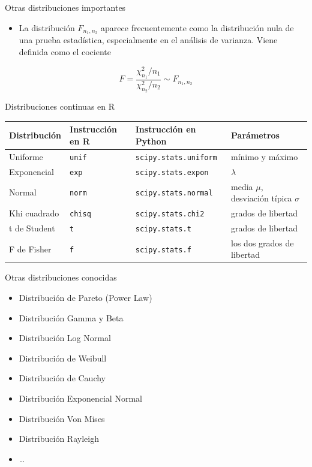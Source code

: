 \documentclass[
  ignorenonframetext,
]{beamer}
\providecommand{\tightlist}{%
  \setlength{\itemsep}{0pt}\setlength{\parskip}{0pt}}
\begin{document}
\begin{frame}{Otras distribuciones importantes}
\protect\hypertarget{otras-distribuciones-importantes-2}{}

\begin{itemize}
\tightlist
\item
  La distribución \(F_{n_1,n_2}\) aparece frecuentemente como la
  distribución nula de una prueba estadística, especialmente en el
  análisis de varianza. Viene definida como el cociente
\end{itemize}

\[F = \frac{\chi^2_{n_1}/n_1}{\chi^2_{n_2}/n_2}\sim F_{n_1,n_2}\]

\end{frame}

\begin{frame}[fragile]{Distribuciones continuas en R}
\protect\hypertarget{distribuciones-continuas-en-r}{}

\begin{longtable}[]{@{}llll@{}}
\toprule
Distribución & Instrucción en R & Instrucción en Python &
Parámetros\tabularnewline
\midrule
\endhead
Uniforme & \texttt{unif} & \texttt{scipy.stats.uniform} & mínimo y
máximo\tabularnewline
Exponencial & \texttt{exp} & \texttt{scipy.stats.expon} &
\(\lambda\)\tabularnewline
Normal & \texttt{norm} & \texttt{scipy.stats.normal} & media \(\mu\),
desviación típica \(\sigma\)\tabularnewline
Khi cuadrado & \texttt{chisq} & \texttt{scipy.stats.chi2} & grados de
libertad\tabularnewline
t de Student & \texttt{t} & \texttt{scipy.stats.t} & grados de
libertad\tabularnewline
F de Fisher & \texttt{f} & \texttt{scipy.stats.f} & los dos grados de
libertad\tabularnewline
\bottomrule
\end{longtable}

\end{frame}

\begin{frame}{Otras distribuciones conocidas}
\protect\hypertarget{otras-distribuciones-conocidas}{}

\begin{itemize}
\tightlist
\item
  Distribución de Pareto (Power Law)
\item
  Distribución Gamma y Beta
\item
  Distribución Log Normal
\item
  Distribución de Weibull
\item
  Distribución de Cauchy
\item
  Distribución Exponencial Normal
\item
  Distribución Von Mises
\item
  Distribución Rayleigh
\item
  \ldots{}
\end{itemize}

\end{frame}
\end{document}

